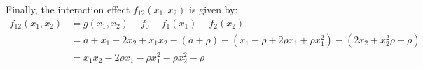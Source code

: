 Finally, the interaction effect \( f_{12}(x_1, x_2) \) is given by:
\begin{align*}
f_{12}(x_1, x_2) 
&= g(x_1, x_2) - f_0 - f_1(x_1) - f_2(x_2) \\
&= a + x_1 + 2x_2 + x_1 x_2 - (a + \rho) - (x_1 - \rho + 2\rho x_1 + \rho x_1^2) - (2x_2 + x_2^2 \rho + \rho) \\
&= x_1 x_2 - 2\rho x_1 - \rho x_1^2 - \rho x_2^2 - \rho
\end{align*}
